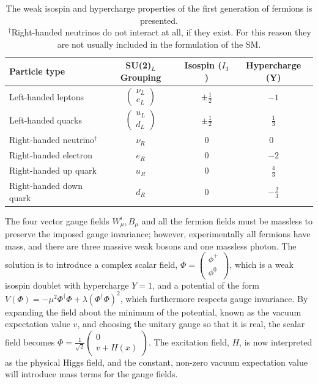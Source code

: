 \begin{table}[tbp]
\begin{center}
\begin{tabular}{lccc}
\hline\hline
Particle type & SU(2)$_L$ Grouping & Isospin ($I_3$) & Hypercharge (Y) \\\hline
Left-handed leptons &$ \begin{pmatrix} \nu_L \\ e_L \end{pmatrix} $& $\pm\frac{1}{2}$ &$ -1$\\
Left-handed quarks &$ \begin{pmatrix} u_L \\ d_L \end{pmatrix} $& $\pm\frac{1}{2}$ &$ \frac{1}{3}$\\
Right-handed neutrino$^{\dagger}$& $\nu_R$ & 0 & 0 \\
Right-handed electron & $e_R$ & 0 & $-2$ \\
Right-handed up quark & $u_R$ & 0 & $\frac{4}{3}$\\
Right-handed down quark & $d_R$ & 0 &$-\frac{2}{3}$\\\hline\hline
\end{tabular}
\end{center}
\caption[Weak isospin and hypercharge groupings of the electroweak sector]{The weak isospin and hypercharge properties of the first generation of fermions is presented.\\\,$^{\dagger}$Right-handed neutrinos do not interact at all, if they exist. For this reason they are not usually included in the formulation of the SM.}
\label{tab:ew_rep}
\end{table}

The four vector gauge fields $W_{\mu}^i, B_{\mu}$ and all the fermion fields must be massless to preserve the imposed gauge invariance; however, experimentally all fermions have mass, and there are three massive weak bosons and one massless photon. The solution is to introduce a complex scalar field, $\Phi=\begin{pmatrix}\phi^+\\\phi^0\end{pmatrix}$, which is a weak isospin doublet with hypercharge $Y=1$, and a potential of the form $V(\Phi) = -\mu^2\Phi^{\dagger}\Phi + \lambda(\Phi^{\dagger}\Phi)^2$, which furthermore respects gauge invariance. By expanding the field about the minimum of the potential, known as the vacuum expectation value $v$, and choosing the unitary gauge so that it is real, the scalar field becomes $\Phi=\frac{1}{\sqrt{2}}\begin{pmatrix}0\\v+H(x)\end{pmatrix}$. The excitation field, $H$, is now interpreted as the physical Higgs field, and the constant, non-zero vacuum expectation value will introduce mass terms for the gauge fields.

